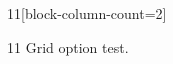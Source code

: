 \documentclass[paper=A4]{ropas-poster}
\begin{document}
\begin{postergrid}{1}{1}[block-column-count=2]
\begin{posterblock}{1}{1}
Grid option test.
\end{posterblock}
\end{postergrid}
\end{document}
